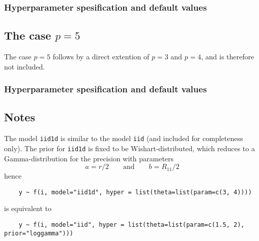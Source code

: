 \documentclass[a4paper,11pt]{article}
\begin{document}
\subsubsection*{Hyperparameter spesification and default values}



\subsection*{The case $p=5$}

The case $p=5$ follows by a direct extention of $p=3$ and $p=4$, and
is therefore not included.

\subsubsection*{Hyperparameter spesification and default values}


\subsection*{Notes}

The model \texttt{iid1d} is similar to the model \texttt{iid} (and
included for completeness only). The prior for \texttt{iid1d} is fixed
to be Wishart-distributed, which reduces to a Gamma-distribution for
the precision with parameters
\begin{displaymath}
    a = r/2 \qquad\text{and}\qquad b = R_{11}/2
\end{displaymath}
hence
\begin{verbatim}
    y ~ f(i, model="iid1d", hyper = list(theta=list(param=c(3, 4))))
\end{verbatim}
is equivalent to
\begin{verbatim}
    y ~ f(i, model="iid", hyper = list(theta=list(param=c(1.5, 2), prior="loggamma")))
\end{verbatim}
\end{document}
